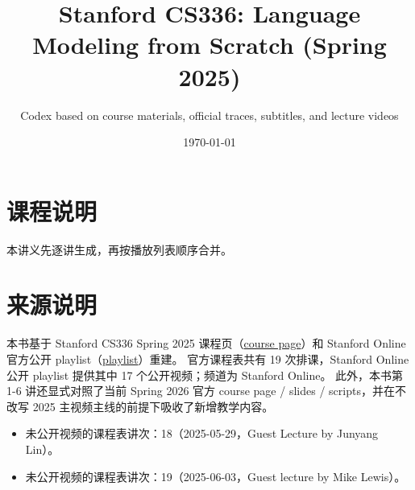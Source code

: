 \documentclass[a4paper]{article}
\title{Stanford CS336: Language Modeling from Scratch (Spring 2025)}
\author{Codex based on course materials, official traces, subtitles, and lecture videos}
\date{\today}
\begin{document}
\maketitle
\tableofcontents
\newpage
\section*{课程说明}
本讲义先逐讲生成，再按播放列表顺序合并。
\section*{来源说明}
本书基于 Stanford CS336 Spring 2025 课程页（\href{https://cs336.stanford.edu/spring2025/}{course page}）和 Stanford Online 官方公开 playlist（\href{https://www.youtube.com/playlist?list=PLoROMvodv4rOY23Y0BoGoBGgQ1zmU_MT_}{playlist}）重建。
官方课程表共有 19 次排课，Stanford Online 公开 playlist 提供其中 17 个公开视频；频道为 Stanford Online。
此外，本书第 1-6 讲还显式对照了当前 Spring 2026 官方 course page / slides / scripts，并在不改写 2025 主视频主线的前提下吸收了新增教学内容。
\begin{itemize}
\item 未公开视频的课程表讲次：18（2025-05-29，Guest Lecture by Junyang Lin）。
\item 未公开视频的课程表讲次：19（2025-06-03，Guest lecture by Mike Lewis）。
\end{itemize}
\end{document}
